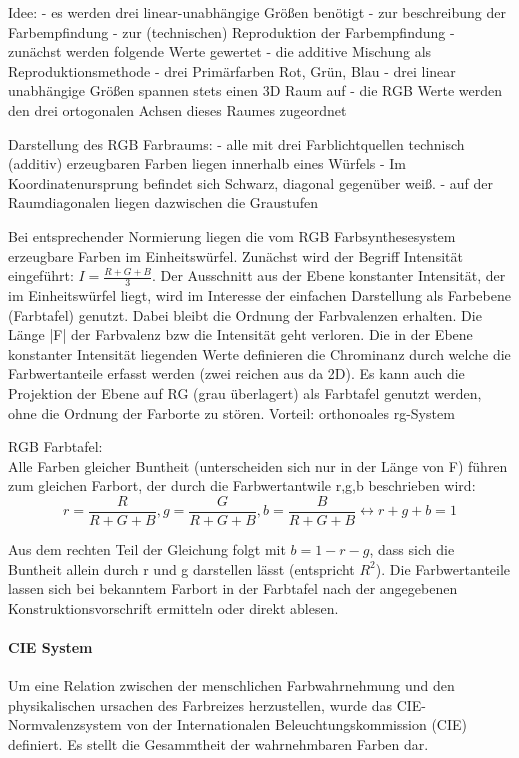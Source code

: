 \documentclass[10pt,landscape]{article}
\begin{document}
\begin{multicols}{3}
  Idee:
  - es werden drei linear-unabhängige Größen benötigt
  - zur beschreibung der Farbempfindung
  - zur (technischen) Reproduktion der Farbempfindung
  - zunächst werden folgende Werte gewertet
  - die additive Mischung als Reproduktionsmethode
  - drei Primärfarben Rot, Grün, Blau
  - drei linear unabhängige Größen spannen stets einen 3D Raum auf
  - die RGB Werte werden den drei ortogonalen Achsen dieses Raumes zugeordnet
  
  Darstellung des RGB Farbraums:
  - alle mit drei Farblichtquellen technisch (additiv) erzeugbaren Farben liegen innerhalb eines Würfels
  - Im Koordinatenursprung befindet sich Schwarz, diagonal gegenüber weiß.
  - auf der Raumdiagonalen liegen dazwischen die Graustufen
  
  Bei entsprechender Normierung liegen die vom RGB Farbsynthesesystem erzeugbare Farben im Einheitswürfel. Zunächst wird der Begriff Intensität eingeführt: $I=\frac{R+G+B}{3}$. Der Ausschnitt aus der Ebene konstanter Intensität, der im Einheitswürfel liegt, wird im Interesse der einfachen Darstellung als Farbebene (Farbtafel) genutzt. Dabei bleibt die Ordnung der Farbvalenzen erhalten. Die Länge |F| der Farbvalenz bzw die Intensität geht verloren.
  Die in der Ebene konstanter Intensität liegenden Werte definieren die Chrominanz durch welche die Farbwertanteile erfasst werden (zwei reichen aus da 2D). Es kann auch die Projektion der Ebene auf RG (grau überlagert) als Farbtafel genutzt werden, ohne die Ordnung der Farborte zu stören. Vorteil: orthonoales rg-System
  
  RGB Farbtafel:\\
  Alle Farben gleicher Buntheit (unterscheiden sich nur in der Länge von F) führen zum gleichen Farbort, der durch die Farbwertantwile r,g,b beschrieben wird:
  $$r=\frac{R}{R+G+B}, g=\frac{G}{R+G+B}, b=\frac{B}{R+G+B} \leftrightarrow r+g+b=1$$
  
  Aus dem rechten Teil der Gleichung folgt mit $b=1-r-g$, dass sich die Buntheit allein durch r und g darstellen lässt (entspricht $R^2$).
  Die Farbwertanteile lassen sich bei bekanntem Farbort in der Farbtafel nach der angegebenen Konstruktionsvorschrift ermitteln oder direkt ablesen.
  
  
  \paragraph{CIE System}
  Um eine Relation zwischen der menschlichen Farbwahrnehmung und den physikalischen ursachen des Farbreizes herzustellen, wurde das CIE-Normvalenzsystem von der Internationalen Beleuchtungskommission (CIE) definiert. Es stellt die Gesammtheit der wahrnehmbaren Farben dar.
  

\end{multicols}
\end{document}
